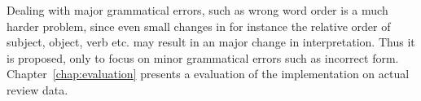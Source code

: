 Dealing with major grammatical errors, such as wrong word order is a much harder problem, since even small changes in for instance the relative order of subject, object, verb etc. may result in an major change in interpretation. Thus it is proposed, only to focus on minor grammatical errors such as incorrect form. Chapter~\ref{chap:evaluation} presents a evaluation of the implementation on actual review data.
